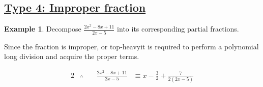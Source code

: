 \documentclass[12pt, a4paper]{report}
\theoremstyle{definition}
\newtheorem{example}{Example}
\begin{document}
	\subsection*{\underline{Type 4: Improper fraction}}
	\begin{example}
		Decompose $\frac{2x^2 -8x +11}{2x-5}$ into its corresponding partial fractions.
	\end{example}
	Since the fraction is improper, or top-heavy\footnotemark[2] it is required to perform a polynomial long division and acquire the proper terms. 
	\begin{center}
	\end{center}
	\begin{alignat*}{2}
		& \therefore\quad & \frac{2x^2 -8x +11}{2x-5} & \equiv 	x - \frac{3}{2} + \frac{7}{2(2x-5)} 
	\end{alignat*}
	\newpage
\end{document}

